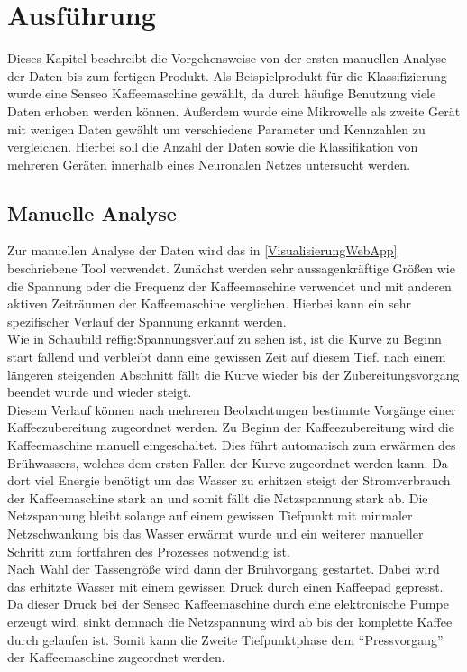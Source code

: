 \chapter{Ausführung}

    Dieses Kapitel beschreibt die Vorgehensweise von der ersten manuellen Analyse der Daten bis zum fertigen Produkt.
    Als Beispielprodukt für die Klassifizierung wurde eine Senseo Kaffeemaschine gewählt, da durch häufige Benutzung viele Daten erhoben werden können. 
    Außerdem wurde eine Mikrowelle als zweite Gerät mit wenigen Daten gewählt um verschiedene Parameter und Kennzahlen zu vergleichen.
    Hierbei soll die Anzahl der Daten sowie die Klassifikation von mehreren Geräten innerhalb eines Neuronalen Netzes untersucht werden.

\section{Manuelle Analyse} \label{ManuelleAnalyse}

    Zur manuellen Analyse der Daten wird das in \ref{VisualisierungWebApp} beschriebene Tool verwendet.
    Zunächst werden sehr aussagenkräftige Größen wie die Spannung oder die Frequenz der Kaffeemaschine verwendet und mit anderen aktiven Zeiträumen der Kaffeemaschine verglichen.
    Hierbei kann ein sehr spezifischer Verlauf der Spannung erkannt werden.\\ 
    Wie in Schaubild ref{fig:Spannungsverlauf} zu sehen ist, ist die Kurve zu Beginn start fallend und verbleibt dann eine gewissen Zeit auf diesem Tief. 
    nach einem längeren steigenden Abschnitt fällt die Kurve wieder bis der Zubereitungsvorgang beendet wurde und wieder steigt.\\
    \newline
    Diesem Verlauf können nach mehreren Beobachtungen bestimmte Vorgänge einer Kaffeezubereitung zugeordnet werden.
    Zu Beginn der Kaffeezubereitung wird die Kaffeemaschine manuell eingeschaltet. 
    Dies führt automatisch zum erwärmen des Brühwassers, welches dem ersten Fallen der Kurve zugeordnet werden kann. 
    Da dort viel Energie benötigt um das Wasser zu erhitzen steigt der Stromverbrauch der Kaffeemaschine stark an und somit fällt die Netzspannung stark ab.
    Die Netzspannung bleibt solange auf einem gewissen Tiefpunkt mit minmaler Netzschwankung bis das Wasser erwärmt wurde und ein weiterer manueller Schritt zum fortfahren des Prozesses notwendig ist.\\
    Nach Wahl der Tassengröße wird dann der Brühvorgang gestartet. 
    Dabei wird das erhitzte Wasser mit einem gewissen Druck durch einen Kaffeepad gepresst. 
    Da dieser Druck bei der Senseo Kaffeemaschine durch eine elektronische Pumpe erzeugt wird, sinkt demnach die Netzspannung wird ab bis der komplette Kaffee durch gelaufen ist.
    Somit kann die Zweite Tiefpunktphase dem ``Pressvorgang'' der Kaffeemaschine zugeordnet werden.\\
    \newline
    

